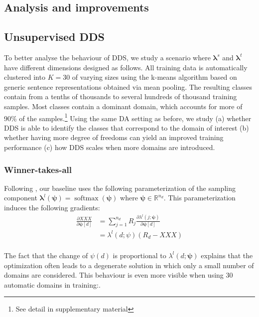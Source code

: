\documentclass[11pt,a4paper]{article}
\newcommand{\fyTodo}[1]{\Todo[FY:]{\textcolor{orange}{#1}}}
\newcommand{\vlambda}{\ensuremath{\boldsymbol\lambda}\xspace} %
\newcommand{\vpsi}{\ensuremath{\boldsymbol\psi}\xspace} %
\begin{document}
\subsection{Analysis and improvements}

\subsection{Unsupervised DDS}
To better analyse the behaviour of DDS, we study a scenario where $\vlambda^s$ and $\vlambda^t$ have different dimensions designed as follows. All training data is automatically clustered into $K=30$ of varying sizes using the k-means algorithm based on generic sentence representations obtained via mean pooling. The resulting classes contain from a tenths of thousands to several hundreds of thousand training samples. Most classes contain a dominant domain, which accounts for more of 90\% of the samples.\footnote{See detail in supplementary material} Using the same DA setting as before, we study (a) whether DDS is able to identify the classes that correspond to the domain of interest (b) whether having more degree of freedoms can yield an improved training performance (c) how DDS scales when more domains are introduced.\fyTodo{TBC - with what experiments?}

\subsubsection{Winner-takes-all}

Following \citep{Wang20balancing}, our baseline uses the following parameterization of the sampling component $\vlambda^l(\vpsi) = \operatorname{softmax}(\vpsi)$ where $\vpsi \in \mathbb{R}^{n_d}$. This parameterization induces the following gradients:\fyTodo{Change name of obj. function}
\begin{align*}
\frac{\partial XXX}{\partial \vpsi[d]} & = \displaystyle{\mathop{\sum}_{j=1}^{n_d}} R_j \frac{\partial \lambda^l(j; \vpsi)}{\partial \vpsi[d]} \\
	& = \lambda^l(d; \psi) (R_d- XXX)\\
\end{align*}

The fact that the change of $\psi(d)$ is proportional to $\lambda^l(d; \vpsi)$ explains that the optimization often leads to a degenerate solution in which only a small number of domains are considered. This behaviour is even more visible when using 30 automatic domains in training:\fyTodo{What results would be useful ?}.
\end{document}
